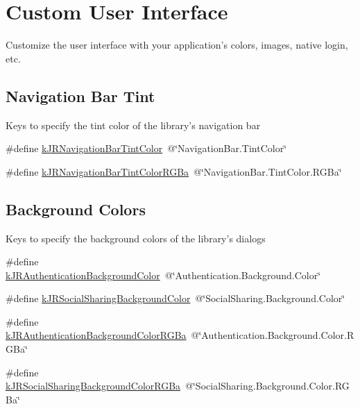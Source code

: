 \hypertarget{group__custom_interface}{
\section{Custom User Interface}
\label{group__custom_interface}
}


Customize the user interface with your application's colors, images, native login, etc.  


\subsection*{Navigation Bar Tint}
\label{_amgrpcbb064fcefe41751c8f91866832360e5}
Keys to specify the tint color of the library's navigation bar

\label{group__custom_interface_customInterfaceKeys}
\hypertarget{group__custom_interface_customInterfaceKeys}{}
 \begin{DoxyCompactItemize}
\item 
\#define \hyperlink{group__custom_interface_ga7c7ed7dac155537c9bc14531c5cec3cb}{kJRNavigationBarTintColor}~@\char`\"{}NavigationBar.TintColor\char`\"{}
\item 
\#define \hyperlink{group__custom_interface_gabda4f66c5cde44bbeaa6a993f4793ac5}{kJRNavigationBarTintColorRGBa}~@\char`\"{}NavigationBar.TintColor.RGBa\char`\"{}
\end{DoxyCompactItemize}
\subsection*{Background Colors}
\label{_amgrpdc55f9575e9d43d9a94ff15dba82dbbc}
 Keys to specify the background colors of the library's dialogs \begin{DoxyCompactItemize}
\item 
\#define \hyperlink{group__custom_interface_gacfe014997457d27386eff69eb731ce0f}{kJRAuthenticationBackgroundColor}~@\char`\"{}Authentication.Background.Color\char`\"{}
\item 
\#define \hyperlink{group__custom_interface_ga404751db179428ee64bbe2fda663efa6}{kJRSocialSharingBackgroundColor}~@\char`\"{}SocialSharing.Background.Color\char`\"{}
\item 
\#define \hyperlink{group__custom_interface_gae0c84a976949aa4eccecc123786efb3c}{kJRAuthenticationBackgroundColorRGBa}~@\char`\"{}Authentication.Background.Color.RGBa\char`\"{}
\item 
\#define \hyperlink{group__custom_interface_ga6554a101f0e2e9474a77262143dc528b}{kJRSocialSharingBackgroundColorRGBa}~@\char`\"{}SocialSharing.Background.Color.RGBa\char`\"{}
\end{DoxyCompactItemize}
